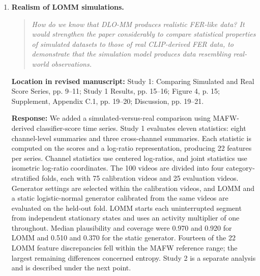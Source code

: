 \documentclass[11pt]{article}
\newenvironment{reviewquote}{\begin{quote}\small\itshape}{\end{quote}}
\newcommand{\point}[1]{\textbf{#1.}}
\newcommand{\location}[1]{\textbf{Location in revised manuscript:} #1\par}
\newcommand{\response}{\textbf{Response:} }
\begin{document}
\begin{enumerate}[resume]
  All three datasets use eight emotion categories. FindingEmo labels the emotional content of whole scenes, and Image-Emotion and EmoSet concern emotions elicited by images. Mertens et al.'s uncertainties are standard deviations across ten runs. Their FindingEmo evaluation is the closest dataset comparison, but its supervised classifier does not establish equivalence with our zero-shot demonstration. Differences in datasets, label sets, model variants, and training procedures prevent a direct ranking across these studies. These image-level results also do not directly validate facial-expression scores from MAFW videos. The revised manuscript's recovery claims concern the specified continuous-indicator models in Study 2.

  \item \point{Realism of LOMM simulations}
  \begin{reviewquote}
  How do we know that DLO-MM produces realistic FER-like data? It would strengthen the paper considerably to compare statistical properties of simulated datasets to those of real CLIP-derived FER data, to demonstrate that the simulation model produces data resembling real-world observations.
  \end{reviewquote}
  \location{Study 1: Comparing Simulated and Real Score Series, pp. 9--11; Study 1 Results, pp. 15--16; Figure 4, p. 15; Supplement, Appendix C.1, pp. 19--20; Discussion, pp. 19--21.}
  \response We added a simulated-versus-real comparison using MAFW-derived classifier-score time series. Study 1 evaluates eleven statistics: eight channel-level summaries and three cross-channel summaries. Each statistic is computed on the scores and a log-ratio representation, producing 22 features per series. Channel statistics use centered log-ratios, and joint statistics use isometric log-ratio coordinates. The 100 videos are divided into four category-stratified folds, each with 75 calibration videos and 25 evaluation videos. Generator settings are selected within the calibration videos, and LOMM and a static logistic-normal generator calibrated from the same videos are evaluated on the held-out fold. LOMM starts each uninterrupted segment from independent stationary states and uses an activity multiplier of one throughout. Median plausibility and coverage were 0.970 and 0.920 for LOMM and 0.510 and 0.370 for the static generator. Fourteen of the 22 LOMM feature discrepancies fell within the MAFW reference range; the largest remaining differences concerned entropy. Study 2 is a separate analysis and is described under the next point.


\end{enumerate}
\end{document}
